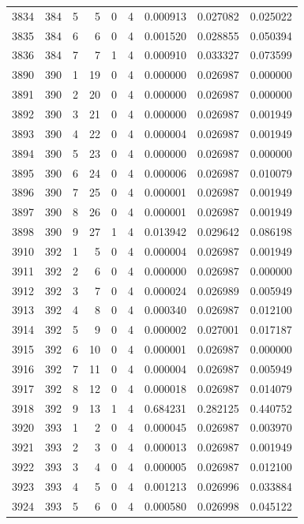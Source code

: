 \begin{longtable}{rrrrrrrrr}
3834 & 384 & 5 & 5 & 0 & 4 & 0.000913 & 0.027082 & 0.025022 \\
3835 & 384 & 6 & 6 & 0 & 4 & 0.001520 & 0.028855 & 0.050394 \\
3836 & 384 & 7 & 7 & 1 & 4 & 0.000910 & 0.033327 & 0.073599 \\
3890 & 390 & 1 & 19 & 0 & 4 & 0.000000 & 0.026987 & 0.000000 \\
3891 & 390 & 2 & 20 & 0 & 4 & 0.000000 & 0.026987 & 0.000000 \\
3892 & 390 & 3 & 21 & 0 & 4 & 0.000000 & 0.026987 & 0.001949 \\
3893 & 390 & 4 & 22 & 0 & 4 & 0.000004 & 0.026987 & 0.001949 \\
3894 & 390 & 5 & 23 & 0 & 4 & 0.000000 & 0.026987 & 0.000000 \\
3895 & 390 & 6 & 24 & 0 & 4 & 0.000006 & 0.026987 & 0.010079 \\
3896 & 390 & 7 & 25 & 0 & 4 & 0.000001 & 0.026987 & 0.001949 \\
3897 & 390 & 8 & 26 & 0 & 4 & 0.000001 & 0.026987 & 0.001949 \\
3898 & 390 & 9 & 27 & 1 & 4 & 0.013942 & 0.029642 & 0.086198 \\
3910 & 392 & 1 & 5 & 0 & 4 & 0.000004 & 0.026987 & 0.001949 \\
3911 & 392 & 2 & 6 & 0 & 4 & 0.000000 & 0.026987 & 0.000000 \\
3912 & 392 & 3 & 7 & 0 & 4 & 0.000024 & 0.026989 & 0.005949 \\
3913 & 392 & 4 & 8 & 0 & 4 & 0.000340 & 0.026987 & 0.012100 \\
3914 & 392 & 5 & 9 & 0 & 4 & 0.000002 & 0.027001 & 0.017187 \\
3915 & 392 & 6 & 10 & 0 & 4 & 0.000001 & 0.026987 & 0.000000 \\
3916 & 392 & 7 & 11 & 0 & 4 & 0.000004 & 0.026987 & 0.005949 \\
3917 & 392 & 8 & 12 & 0 & 4 & 0.000018 & 0.026987 & 0.014079 \\
3918 & 392 & 9 & 13 & 1 & 4 & 0.684231 & 0.282125 & 0.440752 \\
3920 & 393 & 1 & 2 & 0 & 4 & 0.000045 & 0.026987 & 0.003970 \\
3921 & 393 & 2 & 3 & 0 & 4 & 0.000013 & 0.026987 & 0.001949 \\
3922 & 393 & 3 & 4 & 0 & 4 & 0.000005 & 0.026987 & 0.012100 \\
3923 & 393 & 4 & 5 & 0 & 4 & 0.001213 & 0.026996 & 0.033884 \\
3924 & 393 & 5 & 6 & 0 & 4 & 0.000580 & 0.026998 & 0.045122 \\

\end{longtable}
